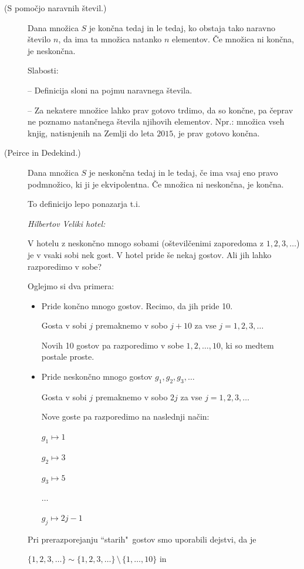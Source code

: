 \documentclass[11pt,paper=b5,footinclude,headinclude]{scrbook} %
\def\brez {{\,\setminus\,}}
\begin{document}
\begin{description}
  \item[(S pomočjo naravnih števil.)] Dana množica $S$ je končna tedaj in le tedaj, ko obstaja tako naravno število $n$, da ima ta množica natanko $n$ elementov. Če množica ni končna, je neskončna.

      Slabosti:

      -- Definicija sloni na pojmu naravnega števila.

      -- Za nekatere množice lahko prav gotovo trdimo, da so končne, pa čeprav ne poznamo natančnega števila njihovih elementov. Npr.: množica vseh knjig, natisnjenih na Zemlji do leta $2015$, je prav gotovo končna.

  \item[(Peirce in Dedekind.)] Dana množica $S$ je neskončna tedaj in le tedaj, če ima vsaj
  eno pravo podmnožico, ki ji je ekvipolentna. Če množica ni neskončna, je končna.

  \medskip
  To definicijo lepo ponazarja t.i.~{\em Hilbertov Veliki hotel:

  V hotelu z neskončno mnogo sobami (oštevilčenimi zaporedoma z $1,2,3,\ldots$) je v vsaki sobi nek gost. V hotel pride še nekaj gostov. Ali jih lahko razporedimo v sobe?}

  Oglejmo si dva primera:
\begin{itemize}
  \item {Pride končno mnogo gostov.} Recimo, da jih pride 10.

  Gosta v sobi $j$ premaknemo v sobo $j+10$ za vse $j = 1,2,3,\ldots$

  Novih 10 gostov pa razporedimo v sobe $1,2,\ldots, 10$, ki so medtem postale proste.

  \item {Pride neskončno mnogo gostov $g_1, g_2, g_3,\ldots$}

  Gosta v sobi $j$ premaknemo v sobo $2j$ za vse $j = 1,2,3,\ldots$

  Nove goste pa razporedimo na naslednji način:

  $g_1\mapsto 1$

  $g_2\mapsto 3$

  $g_3\mapsto 5$

  $\ldots$

  $g_j\mapsto 2j-1$
\end{itemize}


  Pri prerazporejanju ``starih"~gostov smo uporabili dejstvi, da je

  $\{1,2,3,\ldots\}\sim\{1,2,3,\ldots\}\brez\{1,\ldots,10\}$ in


\end{description}
\end{document}
